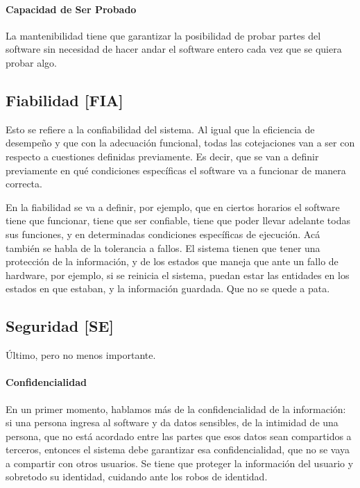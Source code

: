 \hypertarget{testeable}{%
\paragraph{Capacidad de Ser Probado}\label{testeable}}
La mantenibilidad tiene que
  garantizar la posibilidad de probar partes del software sin necesidad
  de hacer andar el software entero cada vez que se quiera probar algo.

\hypertarget{fiabilidad-fia}{%
\subsection{Fiabilidad {[}FIA{]}}\label{fiabilidad-fia}}

Esto se refiere a la confiabilidad del sistema. Al igual que la
eficiencia de desempeño y que con la adecuación funcional, todas las
cotejaciones van a ser con respecto a cuestiones definidas previamente.
Es decir, que se van a definir previamente en qué condiciones
específicas el software va a funcionar de manera correcta.

En la fiabilidad se va a definir, por ejemplo, que en ciertos horarios
el software tiene que funcionar, tiene que ser confiable, tiene que
poder llevar adelante todas sus funciones, y en determinadas condiciones
específicas de ejecución. Acá también se habla de la tolerancia a
fallos. El sistema tienen que tener una protección de la información, y
de los estados que maneja que ante un fallo de hardware, por ejemplo, si
se reinicia el sistema, puedan estar las entidades en los estados en que
estaban, y la información guardada. Que no se quede a pata.

\hypertarget{seguridad-se}{%
\subsection{Seguridad {[}SE{]}}\label{seguridad-se}}

Último, pero no menos importante.


\hypertarget{confidencialidad}{%
\paragraph{Confidencialidad}\label{confidencialidad}}
En un primer momento, hablamos más de la
  confidencialidad de la información: si una persona ingresa al software
  y da datos sensibles, de la intimidad de una persona, que no está
  acordado entre las partes que esos datos sean compartidos a terceros,
  entonces el sistema debe garantizar esa confidencialidad, que no se
  vaya a compartir con otros usuarios. Se tiene que proteger la
  información del usuario y sobretodo su identidad, cuidando ante los
  robos de identidad.


